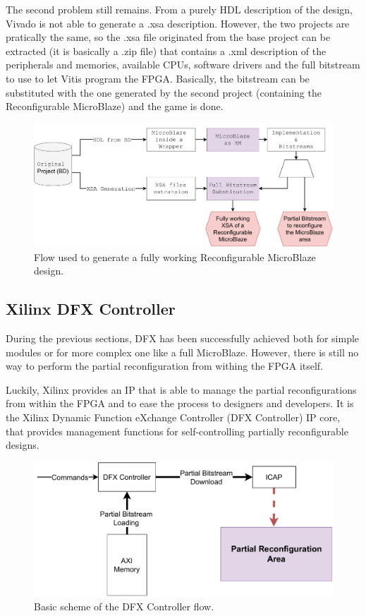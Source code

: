 The second problem still remains. From a purely HDL description of the design, Vivado is not able to generate a .xsa description. However, the two projects are pratically the same, so the .xsa file originated from the base project can be extracted (it is basically a .zip file) that contains a .xml description of the peripherals and memories, available CPUs, software drivers and the full bitstream to use to let Vitis program the FPGA. Basically, the bitstream can be substituted with the one generated by the second project (containing the Reconfigurable MicroBlaze) and the game is done.

\begin{figure}[H]
\centering
\includegraphics[width=1.0\linewidth]{images/chapter4/mystic_flow.pdf}
\caption{Flow used to generate a fully working Reconfigurable MicroBlaze design.}
\end{figure}

\subsection{Xilinx DFX Controller}
During the previous sections, DFX has been successfully achieved both for simple modules or for more complex one like a full MicroBlaze. However, there is still no way to perform the partial reconfiguration from withing the FPGA itself. \bigskip

Luckily, Xilinx provides an IP that is able to manage the partial reconfigurations from within the FPGA and to ease the process to designers and developers. It is the Xilinx Dynamic Function eXchange Controller (DFX Controller) IP core, that provides management functions for self-controlling partially reconfigurable designs. \bigskip

\begin{figure}[H]
\centering
\includegraphics[width=0.9\linewidth]{images/chapter4/dfxc.pdf}
\caption{Basic scheme of the DFX Controller flow.}
\end{figure}

